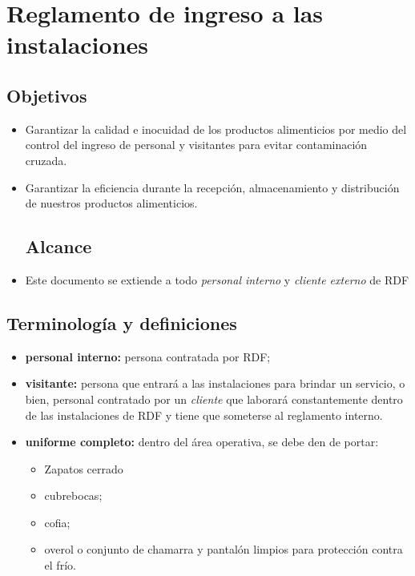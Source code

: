 \renewcommand{\Codigo}{BPD-PROG}
\renewcommand{\FechaPub}{2023-01}
\renewcommand{\Edit}{03}
\renewcommand{\Titulo}{Reglamento de ingreso a las instalaciones}

\section{\Titulo}

\subsection{Objetivos}

\begin{itemize}
	\item Garantizar la calidad e inocuidad de los productos alimenticios por medio del control del ingreso de personal y visitantes para evitar contaminación cruzada.
	\item Garantizar la eficiencia durante la recepción, almacenamiento y distribución de nuestros productos alimenticios.
\subsection{Alcance}
	\item Este documento se extiende a todo \emph{personal interno} y \emph{cliente externo} de RDF
\end{itemize}

\subsection{Terminología y definiciones}

\begin{itemize}
	\item \textbf{personal interno:} persona contratada por RDF;
	\item \textbf{visitante:} persona que entrará a las instalaciones para brindar un servicio, o bien, personal contratado por un \emph{cliente} que laborará constantemente dentro de las instalaciones de RDF y tiene que someterse al reglamento interno.
	\item \textbf{uniforme completo:} dentro del área operativa, se debe den de portar:
	\begin{itemize}
		\item Zapatos cerrado
		\item cubrebocas;
		\item cofia;
		\item overol o conjunto de chamarra y pantalón limpios para protección contra el frío.
	\end{itemize}
\end{itemize}

